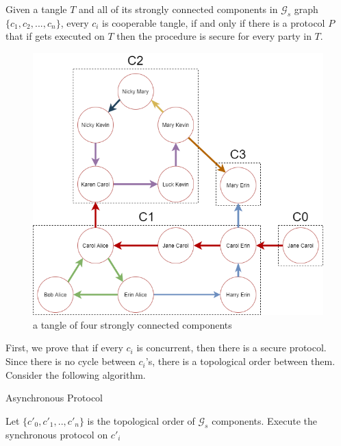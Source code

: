 \begin{theorem}
\label{th:gen}
Given a tangle $T$ and all of its strongly connected components in $\mathcal{G}_s$ graph $\{c_1, c_2, ..., c_n\}$, every $c_i$ is cooperable tangle, if and only if there is a protocol $P$ that if gets executed on $T$ then the procedure is secure for every party in $T$.
\end{theorem} 


\begin{figure}
    \centering
    \includegraphics[width=\textwidth]{figures/uni-example.png}
    \caption{a tangle of four strongly connected components}
    \label{fig:uni-tangel}
\end{figure}

First, we prove that if every $c_i$ is concurrent, then there is a secure protocol. Since there is no cycle between $c_i$'s, there is a topological order between them. Consider the following algorithm.


\begin{algorithm}[H]
\label{alg:general_protocol}
\caption{Asynchronous Protocol}
\begin{algorithmic}
\State Let $\{c'_0, c'_1, .., c'_n\}$ is the topological order of $\mathcal{G}_s$ components.
\State Execute the synchronous protocol on $c'_i$
\EndFor
\end{algorithmic}
\end{algorithm}

